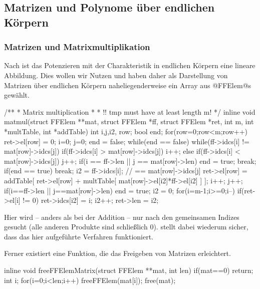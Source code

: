 \subsection{Matrizen und Polynome über endlichen Körpern}

\subsubsection{Matrizen und Matrixmultiplikation}

Nach  ist das Potenzieren mit der Charakteristik in
endlichen Körpern eine lineare Abbildung. Dies wollen wir Nutzen und haben
daher als Darstellung von Matrizen über endlichen Körpern naheliegenderweise
ein Array aus @FFElem@s gewählt.

\begin{ccode}[caption={Aus \url{../Sage/enumeratePCNs.c}},
  firstnumber=515]
/**
 * Matrix multiplication
 *
 * !! tmp must have at least length m!
 */
inline void matmul(struct FFElem **mat, struct FFElem *ff,
        struct FFElem *ret, 
        int m, int *multTable, int *addTable){
    int i,j,i2, row;
    bool end;
    for(row=0;row<m;row++){
        ret->el[row] = 0;
        i=0; j=0;
        end = false;
        while(end == false){
            while(ff->idcs[i] != mat[row]->idcs[j]){
                if(ff->idcs[i] > mat[row]->idcs[j]) i++;
                else if(ff->idcs[i] < mat[row]->idcs[j]) j++;
                if(i == ff->len || j == mat[row]->len){
                    end = true;
                    break;
                }
            }
            if(end == true) break;
            i2 = ff->idcs[i]; // == mat[row]->idcs[j]
            ret->el[row] = addTable[ ret->el[row] 
                + multTable[ mat[row]->el[i2]*ff->el[i2] ] ];
            i++;
            j++;
            if(i==ff->len || j==mat[row]->len) end = true;
        }
    }
    i2 = 0;
    for(i=m-1;i>=0;i--){
        if(ret->el[i] != 0){
            ret->idcs[i2] = i;
            i2++;
        }
    }
    ret->len = i2;
}
\end{ccode}

Hier wird -- anders als bei der Addition -- nur nach den gemeinsamen Indizes
gesucht (alle anderen Produkte sind schließlich 0). 
 stellt dabei wiederum sicher, dass das hier
aufgeführte Verfahren funktioniert.

Ferner existiert eine Funktion, die das Freigeben von Matrizen erleichtert.

\begin{ccode}[caption={Aus \url{../Sage/enumeratePCNs.c}},
  firstnumber=43]
inline void freeFFElemMatrix(struct FFElem **mat, int len){
    if(mat==0) return;
    int i;
    for(i=0;i<len;i++) freeFFElem(mat[i]);
    free(mat);
}
\end{ccode}


